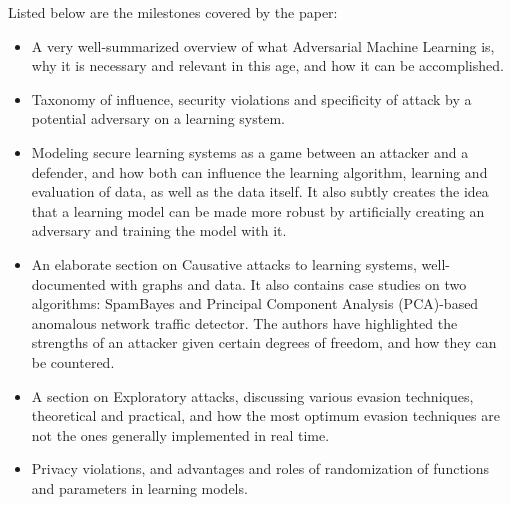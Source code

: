 \documentclass[twoside,twocolumn]{article}
\begin{document}
Listed below are the milestones covered by the paper: 
\begin{itemize}
\item A very well-summarized overview of what Adversarial Machine Learning is, why it is necessary and relevant in this age, and how it can be accomplished.

\item Taxonomy of influence, security violations and specificity of attack by a potential adversary on a learning system.

\item Modeling secure learning systems as a game between an attacker and a defender, and how both can influence the learning algorithm, learning and evaluation of data, as well as the data itself. It also subtly creates the idea that a learning model can be made more robust by artificially creating an adversary and training the model with it.

\item An elaborate section on Causative attacks to learning systems, well-documented with graphs and data. It also contains case studies on two algorithms: SpamBayes and Principal Component Analysis (PCA)-based anomalous network traffic detector. The authors have highlighted the strengths of an attacker given certain degrees of freedom, and how they can be countered.

\item A section on Exploratory attacks, discussing various evasion techniques, theoretical and practical, and how the most optimum evasion techniques are not the ones generally implemented in real time.

\item Privacy violations, and advantages and roles of randomization of functions and parameters in learning models.
\end{itemize}

\end{document}
